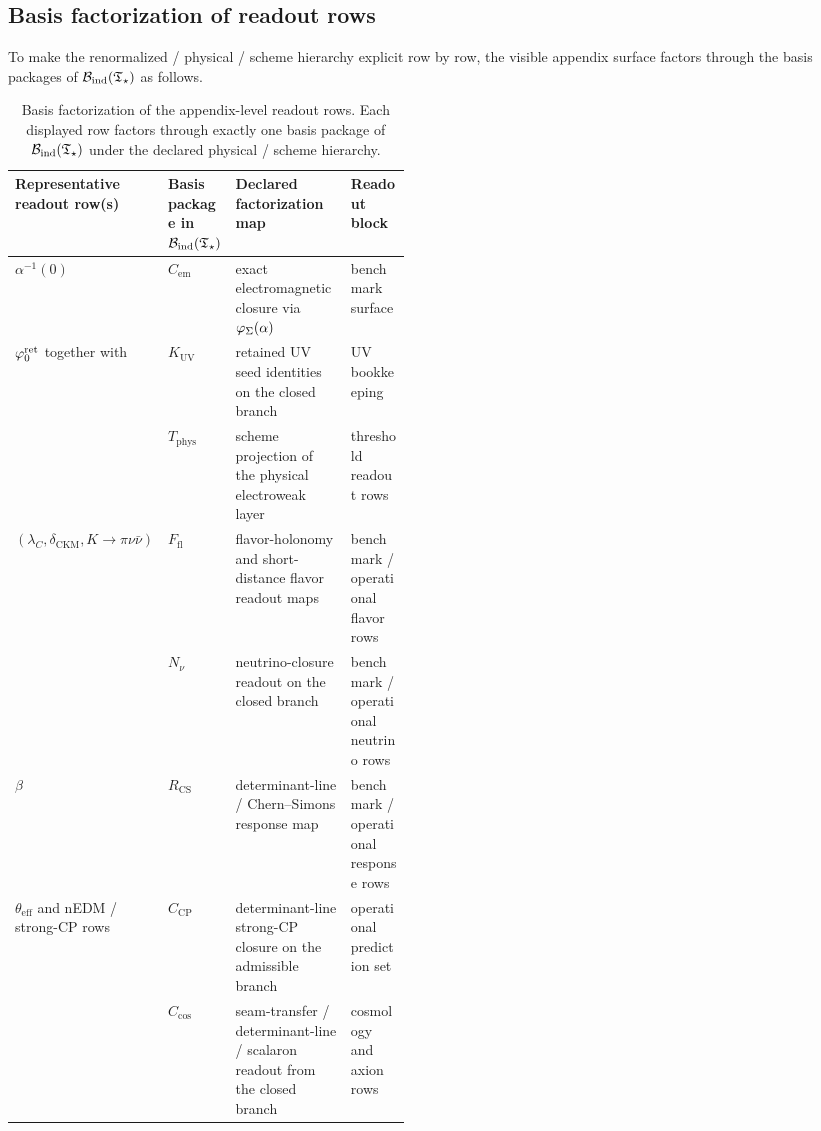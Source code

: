 \subsection{Basis factorization of readout rows}

To make the renormalized / physical / scheme hierarchy explicit row by row, the visible appendix
surface factors through the basis packages of $\Bind(\Tstar)$ as follows.

\begin{table}[t]
\centering
\small
\setlength{\tabcolsep}{3pt}
\begin{tabularx}{\linewidth}{@{}>{\raggedright\arraybackslash}p{0.30\linewidth}>{\raggedright\arraybackslash}p{0.16\linewidth}YY@{}}
\toprule
Representative readout row(s) & Basis package in $\Bind(\Tstar)$ & Declared factorization map & Readout block \\
\midrule
$\alpha^{-1}(0)$ & $C_{\mathrm{em}}$ & exact electromagnetic closure via $\varphi_{\Sigma}(\alpha)$ & benchmark surface \\
$\varphi_0^{\mathrm{ret}}$ together with  & $K_{\mathrm{UV}}$ & retained UV seed identities on the closed branch & UV bookkeeping \\
{} & $T_{\mathrm{phys}}$ & scheme projection of the physical electroweak layer & threshold readout rows \\
$(\lambda_C,\delta_{\mathrm{CKM}},K\to\pi\nu\bar\nu)$ & $F_{\mathrm{fl}}$ & flavor-holonomy and short-distance flavor readout maps & benchmark / operational flavor rows \\
{} & $N_{\nu}$ & neutrino-closure readout on the closed branch & benchmark / operational neutrino rows \\
$\beta$ & $R_{\mathrm{CS}}$ & determinant-line / Chern--Simons response map & benchmark / operational response rows \\
$\theta_{\mathrm{eff}}$ and nEDM / strong-CP rows & $C_{\mathrm{CP}}$ & determinant-line strong-CP closure on the admissible branch & operational prediction set \\
{} & $C_{\mathrm{cos}}$ & seam-transfer / determinant-line / scalaron readout from the closed branch & cosmology and axion rows \\
\bottomrule
\end{tabularx}
\caption{Basis factorization of the appendix-level readout rows. Each displayed row factors through
exactly one basis package of $\Bind(\Tstar)$ under the declared physical / scheme hierarchy.}
\label{tab:basis-factorization}
\end{table}

